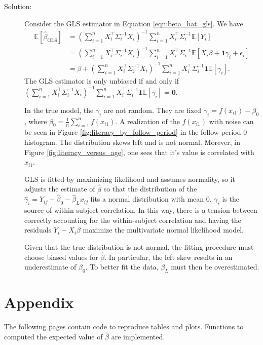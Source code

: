 \documentclass[11pt, letterpaper]{article}
\begin{document}
\begin{enumerate}[(a)]
\begin{description}
\item[Solution:] Consider the GLS estimator in Equation \ref{eqn:beta_hat_gls}. We have
  \begin{align}
    \mathbb{E}\left[\hat{\beta}_{\text{GLS}}\right]
    &=
    \left(\sum_{i=1}^nX_i^\intercal \Sigma_i^{-1}X_i\right)^{-1}
      \sum_{i=1}^n X_i^\intercal\Sigma_i^{-1}\mathbb{E}\left[Y_i\right] \\
    &= \left(\sum_{i=1}^nX_i^\intercal \Sigma_i^{-1}X_i\right)^{-1}
      \sum_{i=1}^n X_i^\intercal\Sigma_i^{-1}\mathbb{E}\left[X_i\beta + \mathbf{1}\gamma_i + \epsilon_i\right] \nonumber\\
    &= \beta + \left(\sum_{i=1}^nX_i^\intercal \Sigma_i^{-1}X_i\right)^{-1}
      \sum_{i=1}^n X_i^\intercal\Sigma_i^{-1}\mathbf{1}\mathbb{E}\left[\gamma_i\right]. \nonumber
  \end{align}
  The GLS estimator is only unbiased if and only if
  $\left(\sum_{i=1}^nX_i^\intercal \Sigma_i^{-1}X_i\right)^{-1}\sum_{i=1}^n
  X_i^\intercal\Sigma_i^{-1}\mathbf{1}\mathbb{E}\left[\gamma_i\right] =
  \mathbf{0}$.

  In the true model, the $\gamma_i$ are not random. They are fixed
  $\gamma_i = f\left(x_{i1}\right) - \beta_0$, where
  $\beta_0 = \frac{1}{n}\sum_{i=1}^nf\left(x_{i1}\right)$. A realization of the
  $f\left(x_{i1}\right)$ with noise can be seen in Figure
  \ref{fig:literacy_by_follow_period} in the follow period $0$ histogram. The
  distribution skews left and is not normal. Morever, in Figure
  \ref{fig:literacy_versus_age}, one sees that it's value is correlated with
  $x_{i1}$.

  GLS is fitted by maximizing likelihood and assumes normality, so it adjusts
  the estimate of $\hat{\beta}$ so that the distribution of the
  $\hat{\gamma}_{i} = Y_{ij} - \hat{\beta}_0 - \hat{\beta}_{L}x_{ij}$ fits a
  normal distribution with mean $0$. $\gamma_i$ is the source of within-subject
  correlation. In this way, there is a tension between correctly accounting for
  the within-subject correlation and having the residuals $Y_{i} - X_{i}\beta$
  maximize the multivariate normal likelihood model.

  Given that the true distribution is not normal, the fitting procedure must
  choose biased values for $\hat{\beta}$. In particular, the left skew results
  in an underestimate of $\beta_0$. To better fit the data, $\beta_L$ must then
  be overestimated.
\end{description}
\end{enumerate}

\section*{Appendix}

The following pages contain code to reproduce tables and plots. Functions to
computed the expected value of $\hat{\beta}$ are implemented.
\clearpage

\end{document}
